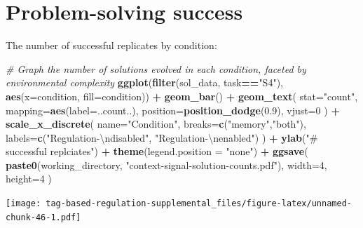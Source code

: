\documentclass[
]{book}
\newenvironment{Shaded}{\begin{snugshade}}{\end{snugshade}}
\newcommand{\CharTok}[1]{\textcolor[rgb]{0.31,0.60,0.02}{#1}}
\newcommand{\CommentTok}[1]{\textcolor[rgb]{0.56,0.35,0.01}{\textit{#1}}}
\newcommand{\DataTypeTok}[1]{\textcolor[rgb]{0.13,0.29,0.53}{#1}}
\newcommand{\DecValTok}[1]{\textcolor[rgb]{0.00,0.00,0.81}{#1}}
\newcommand{\FloatTok}[1]{\textcolor[rgb]{0.00,0.00,0.81}{#1}}
\newcommand{\KeywordTok}[1]{\textcolor[rgb]{0.13,0.29,0.53}{\textbf{#1}}}
\newcommand{\NormalTok}[1]{#1}
\newcommand{\OperatorTok}[1]{\textcolor[rgb]{0.81,0.36,0.00}{\textbf{#1}}}
\newcommand{\StringTok}[1]{\textcolor[rgb]{0.31,0.60,0.02}{#1}}
\begin{document}
\hypertarget{problem-solving-success-1}{%
\section{Problem-solving success}\label{problem-solving-success-1}}

The number of successful replicates by condition:

\begin{Shaded}
\begin{Highlighting}[]
\CommentTok{\# Graph the number of solutions evolved in each condition, faceted by environmental complexity}
\KeywordTok{ggplot}\NormalTok{(}\KeywordTok{filter}\NormalTok{(sol\_data, task}\OperatorTok{==}\StringTok{"S4"}\NormalTok{), }\KeywordTok{aes}\NormalTok{(}\DataTypeTok{x=}\NormalTok{condition, }\DataTypeTok{fill=}\NormalTok{condition)) }\OperatorTok{+}
\StringTok{  }\KeywordTok{geom\_bar}\NormalTok{() }\OperatorTok{+}
\StringTok{  }\KeywordTok{geom\_text}\NormalTok{(}
    \DataTypeTok{stat=}\StringTok{"count"}\NormalTok{,}
    \DataTypeTok{mapping=}\KeywordTok{aes}\NormalTok{(}\DataTypeTok{label=}\NormalTok{..count..),}
    \DataTypeTok{position=}\KeywordTok{position\_dodge}\NormalTok{(}\FloatTok{0.9}\NormalTok{),}
    \DataTypeTok{vjust=}\DecValTok{0}
\NormalTok{  ) }\OperatorTok{+}
\StringTok{  }\KeywordTok{scale\_x\_discrete}\NormalTok{(}
    \DataTypeTok{name=}\StringTok{"Condition"}\NormalTok{,}
    \DataTypeTok{breaks=}\KeywordTok{c}\NormalTok{(}\StringTok{"memory"}\NormalTok{,}\StringTok{"both"}\NormalTok{),}
    \DataTypeTok{labels=}\KeywordTok{c}\NormalTok{(}\StringTok{"Regulation{-}}\CharTok{\textbackslash{}n}\StringTok{disabled"}\NormalTok{, }\StringTok{"Regulation{-}}\CharTok{\textbackslash{}n}\StringTok{enabled"}\NormalTok{)}
\NormalTok{  ) }\OperatorTok{+}
\StringTok{  }\KeywordTok{ylab}\NormalTok{(}\StringTok{"\# successful replciates"}\NormalTok{) }\OperatorTok{+}
\StringTok{  }\KeywordTok{theme}\NormalTok{(}\DataTypeTok{legend.position =} \StringTok{"none"}\NormalTok{) }\OperatorTok{+}
\StringTok{  }\KeywordTok{ggsave}\NormalTok{(}
    \KeywordTok{paste0}\NormalTok{(working\_directory, }\StringTok{"context{-}signal{-}solution{-}counts.pdf"}\NormalTok{),}
    \DataTypeTok{width=}\DecValTok{4}\NormalTok{,}
    \DataTypeTok{height=}\DecValTok{4}
\NormalTok{  )}
\end{Highlighting}
\end{Shaded}

\texttt{[image: tag-based-regulation-supplemental\_files/figure-latex/unnamed-chunk-46-1.pdf]}
\end{document}
